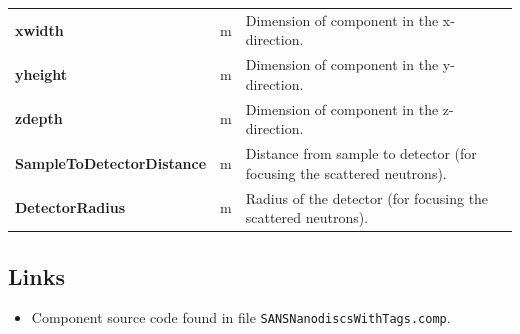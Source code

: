 \begin{longtable}{p{}p{}p{}p{}}
\textbf{xwidth} & m & Dimension of component in the x-direction. &  \\
\textbf{yheight} & m & Dimension of component in the y-direction. &  \\
\textbf{zdepth} & m & Dimension of component in the z-direction. &  \\
\textbf{SampleToDetectorDistance} & m & Distance from sample to detector (for focusing the scattered neutrons). &  \\
\textbf{DetectorRadius} & m & Radius of the detector (for focusing the scattered neutrons). &  \\
\bottomrule
\end{longtable}

\subsection*{Links}
\begin{itemize}
  \item Component source code found in file \texttt{SANSNanodiscsWithTags.comp}.
\end{itemize}
